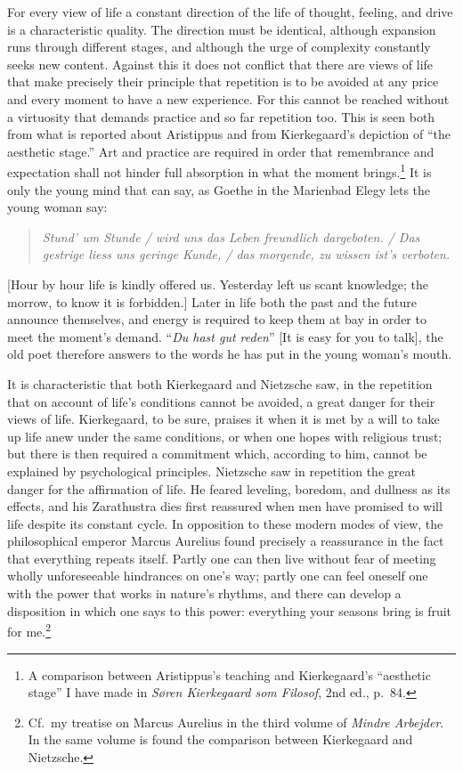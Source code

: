 \documentclass[12pt]{book}
\newcommand{\opage}[1]{\marginnote{\footnotesize\textit{[#1]}}}
\begin{document}
For every view of life a constant direction of the life of thought, feeling, and drive is a characteristic
quality. The direction must be identical, although expansion runs through different stages, and although the
urge of complexity constantly seeks new content. Against this it does not conflict that there are views of life
that make precisely their principle that repetition is to be avoided at any price and every moment to have a new
experience. For this cannot be reached without a virtuosity that demands practice and so far repetition too.
This is seen both from what is reported about Aristippus and from Kierkegaard's depiction of ``the aesthetic
stage.'' Art and practice are required in order that remembrance and expectation shall not hinder full
absorption in what the moment brings.\footnote{A comparison between Aristippus's teaching and Kierkegaard's
``aesthetic stage'' I have made in \textit{Søren Kierkegaard som Filosof}, 2nd ed., p.\ 84.} It is only the
young mind that can say, as Goethe in the Marienbad Elegy lets the young woman say:

\begin{quote}
\textit{Stund' um Stunde / wird uns das Leben freundlich dargeboten. / Das gestrige liess uns geringe Kunde, /
das morgende, zu wissen ist's verboten.}
\end{quote}

[Hour by hour life is kindly offered us. Yesterday left us scant knowledge; the morrow, to know it is forbidden.]
Later in life both the past and the future announce themselves, and energy is required to keep them at bay in
order to meet the moment's demand. ``\textit{Du hast gut reden}'' [It is easy for you to talk], the old poet
therefore answers to the words he has put in the young woman's mouth.

It is characteristic that both Kierkegaard and Nietzsche saw, in the repetition that on account of life's
conditions \opage{66}cannot be avoided, a great danger for their views of life. Kierkegaard, to be sure, praises it when
it is met by a will to take up life anew under the same conditions, or when one hopes with religious trust; but
there is then required a commitment which, according to him, cannot be explained by psychological principles.
Nietzsche saw in repetition the great danger for the affirmation of life. He feared leveling, boredom, and
dullness as its effects, and his Zarathustra dies first reassured when men have promised to will life despite
its constant cycle. In opposition to these modern modes of view, the philosophical emperor Marcus Aurelius found
precisely a reassurance in the fact that everything repeats itself. Partly one can then live without fear of
meeting wholly unforeseeable hindrances on one's way; partly one can feel oneself one with the power that works
in nature's rhythms, and there can develop a disposition in which one says to this power: everything your seasons
bring is fruit for me.\footnote{Cf.\ my treatise on Marcus Aurelius in the third volume of \textit{Mindre
Arbejder}. In the same volume is found the comparison between Kierkegaard and Nietzsche.}
\end{document}
